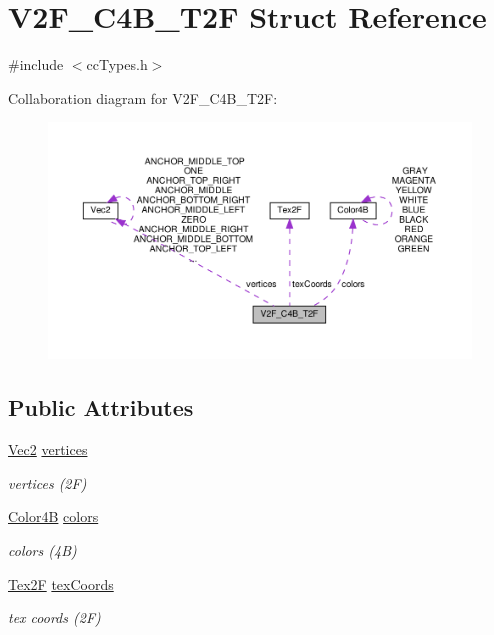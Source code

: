 \hypertarget{structV2F__C4B__T2F}{}\section{V2\+F\+\_\+\+C4\+B\+\_\+\+T2F Struct Reference}
\label{structV2F__C4B__T2F}


{\ttfamily \#include $<$cc\+Types.\+h$>$}



Collaboration diagram for V2\+F\+\_\+\+C4\+B\+\_\+\+T2F\+:
\nopagebreak
\begin{figure}[H]
\begin{center}
\leavevmode
\includegraphics[width=350pt]{structV2F__C4B__T2F__coll__graph}
\end{center}
\end{figure}
\subsection*{Public Attributes}
\begin{DoxyCompactItemize}
\item 
\mbox{\label{structV2F__C4B__T2F_aced96d04f73783f6ca723bad49cb6ff3}} 
\hyperlink{classVec2}{Vec2} \hyperlink{structV2F__C4B__T2F_aced96d04f73783f6ca723bad49cb6ff3}{vertices}
\begin{DoxyCompactList}\small\item\em vertices (2F) \end{DoxyCompactList}\item 
\mbox{\label{structV2F__C4B__T2F_a54c69311dd29524418144c5ca42bb6ff}} 
\hyperlink{structColor4B}{Color4B} \hyperlink{structV2F__C4B__T2F_a54c69311dd29524418144c5ca42bb6ff}{colors}
\begin{DoxyCompactList}\small\item\em colors (4B) \end{DoxyCompactList}\item 
\mbox{\label{structV2F__C4B__T2F_a9b1bbc0c306e0ab18d5dcd01221bb2da}} 
\hyperlink{structTex2F}{Tex2F} \hyperlink{structV2F__C4B__T2F_a9b1bbc0c306e0ab18d5dcd01221bb2da}{tex\+Coords}
\begin{DoxyCompactList}\small\item\em tex coords (2F) \end{DoxyCompactList}\end{DoxyCompactItemize}


